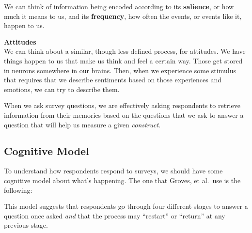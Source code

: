\documentclass[11pt]{lecturenotes}
\begin{document}
We can think of information being encoded according to its \textbf{salience}, or how much it means to us, and its \textbf{frequency}, how often the events, or events like it, happen to us.

\textbf{Attitudes}\\
We can think about a similar, though less defined process, for attitudes. We have things happen to us that make us think and feel a certain way. Those get stored in neurons somewhere in our brains. Then, when we experience some stimulus that requires that we describe sentiments based on those experiences and emotions, we can try to describe them. 

When we ask survey questions, we are effectively asking respondents to retrieve information from their memories based on the questions that we ask to answer a question that will help us measure a given \emph{construct}.

\subsection[15]{Cognitive Model}  
To understand how respondents respond to surveys, we should have some cognitive model about what's happening. The one that Groves, et al.\ use is the following: 

\begin{center}\slide
{}
\end{center}

This model suggests that respondents go through four different stages to answer a question once asked \emph{and} that the process may ``restart'' or ``return'' at any previous stage. 
\end{document}
